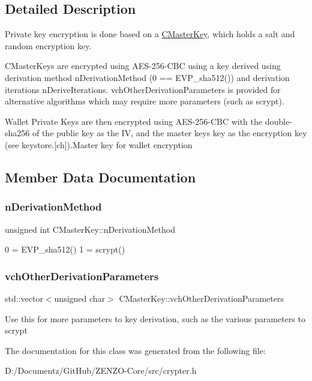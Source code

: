 \subsection{Detailed Description}
Private key encryption is done based on a \mbox{\hyperlink{class_c_master_key}{C\+Master\+Key}}, which holds a salt and random encryption key.

C\+Master\+Keys are encrypted using A\+E\+S-\/256-\/\+C\+BC using a key derived using derivation method n\+Derivation\+Method (0 == E\+V\+P\+\_\+sha512()) and derivation iterations n\+Derive\+Iterations. vch\+Other\+Derivation\+Parameters is provided for alternative algorithms which may require more parameters (such as scrypt).

Wallet Private Keys are then encrypted using A\+E\+S-\/256-\/\+C\+BC with the double-\/sha256 of the public key as the IV, and the master key\textquotesingle{}s key as the encryption key (see keystore.\mbox{[}ch\mbox{]}).Master key for wallet encryption 

\subsection{Member Data Documentation}
\mbox{\label{class_c_master_key_a7a4b1e432a30011297f496441769957f}} 
\subsubsection{\texorpdfstring{nDerivationMethod}{nDerivationMethod}}
{\footnotesize\ttfamily unsigned int C\+Master\+Key\+::n\+Derivation\+Method}

0 = E\+V\+P\+\_\+sha512() 1 = scrypt() \mbox{\label{class_c_master_key_abfd00b311d5e5cf9ae1a6f3877ed35f7}} 
\subsubsection{\texorpdfstring{vchOtherDerivationParameters}{vchOtherDerivationParameters}}
{\footnotesize\ttfamily std\+::vector$<$unsigned char$>$ C\+Master\+Key\+::vch\+Other\+Derivation\+Parameters}

Use this for more parameters to key derivation, such as the various parameters to scrypt 

The documentation for this class was generated from the following file\+:\begin{DoxyCompactItemize}
\item 
D\+:/\+Documentz/\+Git\+Hub/\+Z\+E\+N\+Z\+O-\/\+Core/src/crypter.\+h\end{DoxyCompactItemize}
